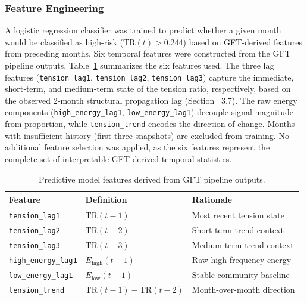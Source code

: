 \documentclass[a4paper,fleqn]{cas-dc}
\begin{document}
\subsubsection{Feature Engineering}
\label{subsec:feature_engineering}

A logistic regression classifier was trained to predict whether a
given month would be classified as high-risk ($\text{TR}(t) > 0.244$) based on GFT-derived features from preceding months. Six temporal features were constructed from the GFT pipeline outputs. Table~\ref{tab:features} summarizes the six features used.
The three lag features (\texttt{tension\_lag1}, \texttt{tension\_lag2}, \texttt{tension\_lag3}) capture the immediate, short‑term, and medium‑term state of the tension ratio, respectively, based on the observed 2‑month structural propagation lag (Section ~3.7). The raw energy components (\texttt{high\_energy\_lag1}, \texttt{low\_energy\_lag1}) decouple signal magnitude from proportion, while \texttt{tension\_trend} encodes the direction of change. Months with insufficient history (first three snapshots) are excluded from training. No additional feature selection was applied, as the six features represent the complete set of interpretable GFT‑derived temporal statistics.

\begin{table}[!t]
\centering
\caption{Predictive model features derived from GFT pipeline outputs.}
\label{tab:features}
\begin{tabular}{lll}
\toprule
\textbf{Feature} & \textbf{Definition} & \textbf{Rationale} \\
\midrule
\texttt{tension\_lag1}     & $\mathrm{TR}(t-1)$
    & Most recent tension state \\
\texttt{tension\_lag2}     & $\mathrm{TR}(t-2)$
    & Short-term trend context \\
\texttt{tension\_lag3}     & $\mathrm{TR}(t-3)$
    & Medium-term trend context \\
\texttt{high\_energy\_lag1} & $E_{\mathrm{high}}(t-1)$
    & Raw high-frequency energy \\
\texttt{low\_energy\_lag1}  & $E_{\mathrm{low}}(t-1)$
    & Stable community baseline \\
\texttt{tension\_trend}    & $\mathrm{TR}(t-1) - \mathrm{TR}(t-2)$
    & Month-over-month direction \\
\bottomrule
\end{tabular}
\end{table}
\end{document}
